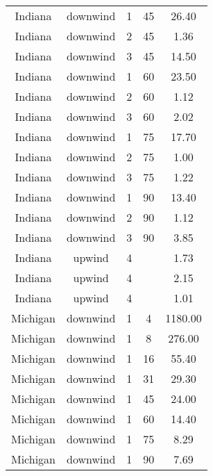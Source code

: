 \documentclass{article}
\begin{document}
\begin{longtable}[H]{ccccc}
Indiana   & downwind  & 1        & 45           & 26.40                   \\
Indiana   & downwind  & 2        & 45           & 1.36                    \\
Indiana   & downwind  & 3        & 45           & 14.50                   \\
Indiana   & downwind  & 1        & 60           & 23.50                   \\
Indiana   & downwind  & 2        & 60           & 1.12                    \\
Indiana   & downwind  & 3        & 60           & 2.02                    \\
Indiana   & downwind  & 1        & 75           & 17.70                   \\
Indiana   & downwind  & 2        & 75           & 1.00                    \\
Indiana   & downwind  & 3        & 75           & 1.22                    \\
Indiana   & downwind  & 1        & 90           & 13.40                   \\
Indiana   & downwind  & 2        & 90           & 1.12                    \\
Indiana   & downwind  & 3        & 90           & 3.85                    \\
Indiana   & upwind    & 4        &              & 1.73                    \\
Indiana   & upwind    & 4        &              & 2.15                    \\
Indiana   & upwind    & 4        &              & 1.01                    \\
Michigan  & downwind  & 1        & 4            & 1180.00                 \\
Michigan  & downwind  & 1        & 8            & 276.00                  \\
Michigan  & downwind  & 1        & 16           & 55.40                   \\
Michigan  & downwind  & 1        & 31           & 29.30                   \\
Michigan  & downwind  & 1        & 45           & 24.00                   \\
Michigan  & downwind  & 1        & 60           & 14.40                   \\
Michigan  & downwind  & 1        & 75           & 8.29                    \\
Michigan  & downwind  & 1        & 90           & 7.69                    \\

\end{longtable}
\end{document}
